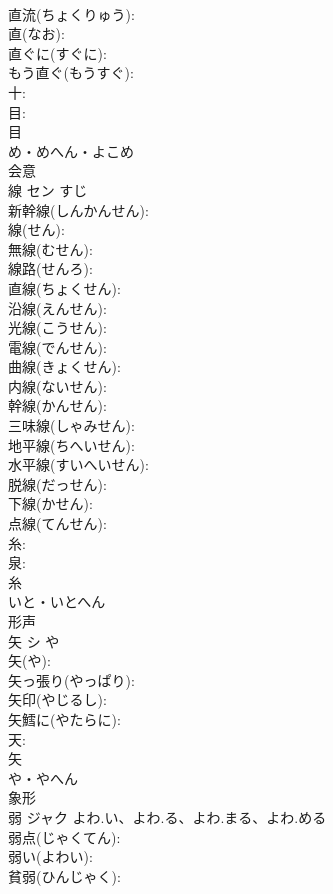 \documentclass[8pt]{extreport}
\begin{document}
\begin{CJK}{UTF8}{min}
\\	直流(ちょくりゅう): 
\\	直(なお): 
\\	直ぐに(すぐに): 
\\	もう直ぐ(もうすぐ): 
\\	十: 
\\	目: 
\\	目	
\\	め・めへん・よこめ	
\\	会意 
\\	線	セン	すじ		
\\	新幹線(しんかんせん): 
\\	線(せん): 
\\	無線(むせん): 
\\	線路(せんろ): 
\\	直線(ちょくせん): 
\\	沿線(えんせん): 
\\	光線(こうせん): 
\\	電線(でんせん): 
\\	曲線(きょくせん): 
\\	内線(ないせん): 
\\	幹線(かんせん): 
\\	三味線(しゃみせん): 
\\	地平線(ちへいせん): 
\\	水平線(すいへいせん): 
\\	脱線(だっせん): 
\\	下線(かせん): 
\\	点線(てんせん): 
\\	糸: 
\\	泉: 
\\	糸	
\\	いと・いとへん	
\\	形声 
\\	矢	シ	や		
\\	矢(や): 
\\	矢っ張り(やっぱり): 
\\	矢印(やじるし): 
\\	矢鱈に(やたらに): 
\\	天: 
\\	矢	
\\	や・やへん	
\\	象形 
\\	弱	ジャク	よわ.い、よわ.る、よわ.まる、よわ.める		
\\	弱点(じゃくてん): 
\\	弱い(よわい): 
\\	貧弱(ひんじゃく): 

\end{CJK}
\end{document}
